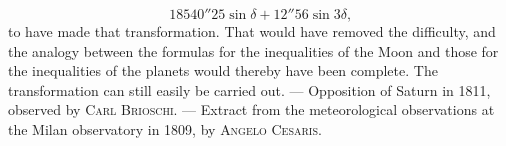 \[
18540''25\sin\delta + 12''56\sin 3\delta\text{,}
\]
to have made that transformation. That would have removed the difficulty, and the analogy between the formulas for the inequalities of the Moon and those for the inequalities of the planets would thereby have been complete. The transformation can still easily be carried out. --- Opposition of Saturn in 1811, observed by \textsc{Carl Brioschi}. --- Extract from the meteorological observations at the Milan observatory in 1809, by \textsc{Angelo Cesaris}.

